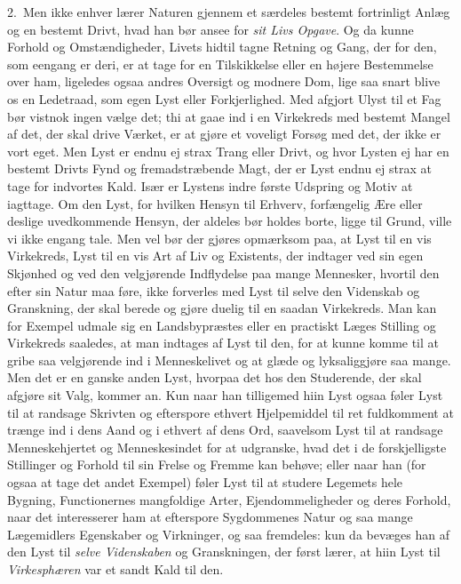 \documentclass[12pt,a4paper]{book}
\newcommand{\apage}[1]{\marginnote{\footnotesize\textit{[#1]}}}
\begin{document}
2.~Men ikke enhver lærer Naturen gjennem et særdeles bestemt fortrinligt Anlæg og
en bestemt Drivt, hvad han bør ansee for \emph{sit Livs Opgave}. Og da kunne Forhold og
Omstændigheder, Livets hidtil tagne Retning og Gang, der for den, som eengang er
deri, er at tage for en Tilskikkelse eller en højere Bestemmelse over ham,
ligeledes ogsaa andres Oversigt og modnere Dom, lige saa snart blive os en
Ledetraad, som egen Lyst eller Forkjerlighed. Med afgjort Ulyst til et Fag bør
vistnok ingen vælge det; thi at gaae ind i en Virkekreds med bestemt Mangel af det,
der skal drive Værket, er at gjøre et voveligt Forsøg med det, der ikke er vort
eget. Men Lyst er endnu ej strax Trang eller Drivt, og hvor \apage{198} Lysten ej har en
bestemt Drivts Fynd og fremadstræbende Magt, der er Lyst endnu ej strax at tage
for indvortes Kald. Især er Lystens indre første Udspring og Motiv at iagttage. Om
den Lyst, for hvilken Hensyn til Erhverv, forfængelig Ære eller deslige
uvedkommende Hensyn, der aldeles bør holdes borte, ligge til Grund, ville vi ikke
engang tale. Men vel bør der gjøres opmærksom paa, at Lyst til en vis Virkekreds,
Lyst til en vis Art af Liv og Existents, der indtager ved sin egen Skjønhed og ved
den velgjørende Indflydelse paa mange Mennesker, hvortil den efter sin Natur maa
føre, ikke forverles med Lyst til selve den Videnskab og Granskning, der skal
berede og gjøre duelig til en saadan Virkekreds. Man kan for Exempel udmale sig en
Landsbypræstes eller en practiskt Læges Stilling og Virkekreds saaledes, at man
indtages af Lyst til den, for at kunne komme til at gribe saa velgjørende ind i
Menneskelivet og at glæde og lyksaliggjøre saa mange. Men det er en ganske anden
Lyst, hvorpaa det hos den Studerende, der skal afgjøre sit Valg, kommer an. Kun
naar han tilligemed hiin Lyst ogsaa føler Lyst til at randsage Skrivten og
efterspore ethvert Hjelpemiddel til ret fuldkomment at trænge ind i dens Aand og i
ethvert af dens Ord, saavelsom Lyst til at randsage Menneskehjertet og
Menneskesindet for at udgranske, hvad det i de forskjelligste Stillinger og \apage{199} Forhold
til sin Frelse og Fremme kan behøve; eller naar han (for ogsaa at tage det andet
Exempel) føler Lyst til at studere Legemets hele Bygning, Functionernes
mangfoldige Arter, Ejendommeligheder og deres Forhold, naar det interesserer ham at
efterspore Sygdommenes Natur og saa mange Lægemidlers Egenskaber og Virkninger, og
saa fremdeles: kun da bevæges han af den Lyst til \emph{selve Videnskaben} og
Granskningen, der først lærer, at hiin Lyst til \emph{Virkesphæren} var et sandt Kald til
den.
\end{document}
